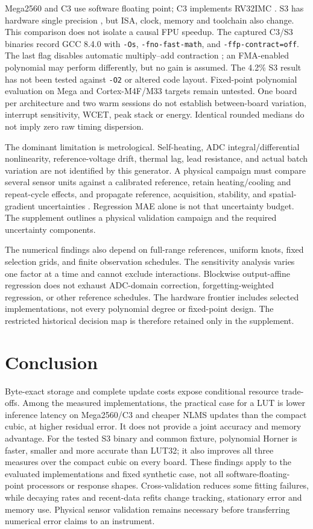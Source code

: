 \documentclass[journal,twoside,web]{ieeecolor}
\begin{document}
Mega2560 and C3 use software floating point; C3 implements RV32IMC \cite{c3}. S3 has hardware single precision \cite{fpu}, but ISA, clock, memory and toolchain also change. This comparison does not isolate a causal FPU speedup. The captured C3/S3 binaries record GCC 8.4.0 with \texttt{-Os}, \texttt{-fno-fast-math}, and \texttt{-ffp-contract=off}. The last flag disables automatic multiply--add contraction \cite{gcc}; an FMA-enabled polynomial may perform differently, but no gain is assumed. The 4.2\% S3 result has not been tested against \texttt{-O2} or altered code layout. Fixed-point polynomial evaluation on Mega and Cortex-M4F/M33 targets remain untested. One board per architecture and two warm sessions do not establish between-board variation, interrupt sensitivity, WCET, peak stack or energy. Identical rounded medians do not imply zero raw timing dispersion.

The dominant limitation is metrological. Self-heating, ADC integral/differential nonlinearity, reference-voltage drift, thermal lag, lead resistance, and actual batch variation are not identified by this generator. A physical campaign must compare several sensor units against a calibrated reference, retain heating/cooling and repeat-cycle effects, and propagate reference, acquisition, stability, and spatial-gradient uncertainties \cite{gum,aranda}. Regression MAE alone is not that uncertainty budget. The supplement outlines a physical validation campaign and the required uncertainty components.

The numerical findings also depend on full-range references, uniform knots, fixed selection grids, and finite observation schedules. The sensitivity analysis varies one factor at a time and cannot exclude interactions. Blockwise output-affine regression does not exhaust ADC-domain correction, forgetting-weighted regression, or other reference schedules. The hardware frontier includes selected implementations, not every polynomial degree or fixed-point design. The restricted historical decision map is therefore retained only in the supplement.

\section{Conclusion}
Byte-exact storage and complete update costs expose conditional resource trade-offs. Among the measured implementations, the practical case for a LUT is lower inference latency on Mega2560/C3 and cheaper NLMS updates than the compact cubic, at higher residual error. It does not provide a joint accuracy and memory advantage. For the tested S3 binary and common fixture, polynomial Horner is faster, smaller and more accurate than LUT32; it also improves all three measures over the compact cubic on every board. These findings apply to the evaluated implementations and fixed synthetic case, not all software-floating-point processors or response shapes. Cross-validation reduces some fitting failures, while decaying rates and recent-data refits change tracking, stationary error and memory use. Physical sensor validation remains necessary before transferring numerical error claims to an instrument.
\end{document}
